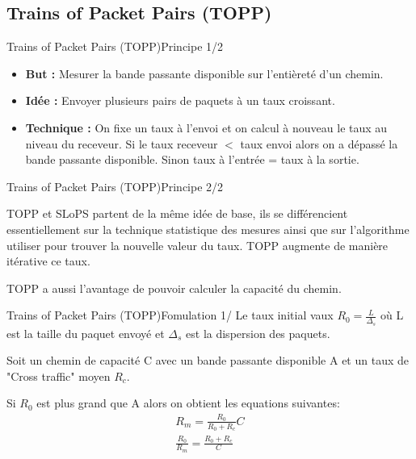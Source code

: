 \documentclass[compress]{beamer}
\begin{document}
\subsection{Trains of Packet Pairs (TOPP)}
\begin{frame}{Trains of Packet Pairs (TOPP)}{Principe 1/2}
\begin{itemize}
\item \textbf{But :}  Mesurer la {\color{red}bande passante disponible} sur l'entièreté d'un chemin.
\pause
\item \textbf{Idée :}  Envoyer plusieurs pairs de paquets à un taux
croissant.
\pause
\item \textbf{Technique :} On fixe un taux à l'envoi et on calcul à
nouveau le taux au niveau du receveur. Si le taux receveur $<$ taux envoi alors on a dépassé la bande passante disponible.
Sinon taux à l'entrée = taux à la sortie.
\end{itemize}
\end{frame}
\begin{frame}{Trains of Packet Pairs (TOPP)}{Principe 2/2}

TOPP et SLoPS partent de la même idée de base, ils se différencient
essentiellement sur la technique statistique des mesures ainsi que sur
l'algorithme utiliser pour trouver la nouvelle valeur du taux.
TOPP augmente de manière itérative ce taux.

TOPP a aussi l'avantage de pouvoir calculer la capacité du chemin.

\end{frame}
\begin{frame}{Trains of Packet Pairs (TOPP)}{Fomulation 1/}
Le taux initial vaux
$R_0 = \frac{L}{\Delta_s}$ où L est la taille du paquet envoyé et $\Delta_s$ est la dispersion des paquets.

Soit un chemin de capacité C avec un bande passante disponible A et
un taux de "Cross traffic" moyen $R_c$.

Si $R_0$ est plus grand que A alors on obtient les equations suivantes:
\begin{align}
R_m = \frac{R_0}{R_0 + R_c}C \\
\frac{R_0}{R_m} = \frac{R_0 + R_c}{C}
\label{capa}
\end{align}
\end{frame}
\end{document}
